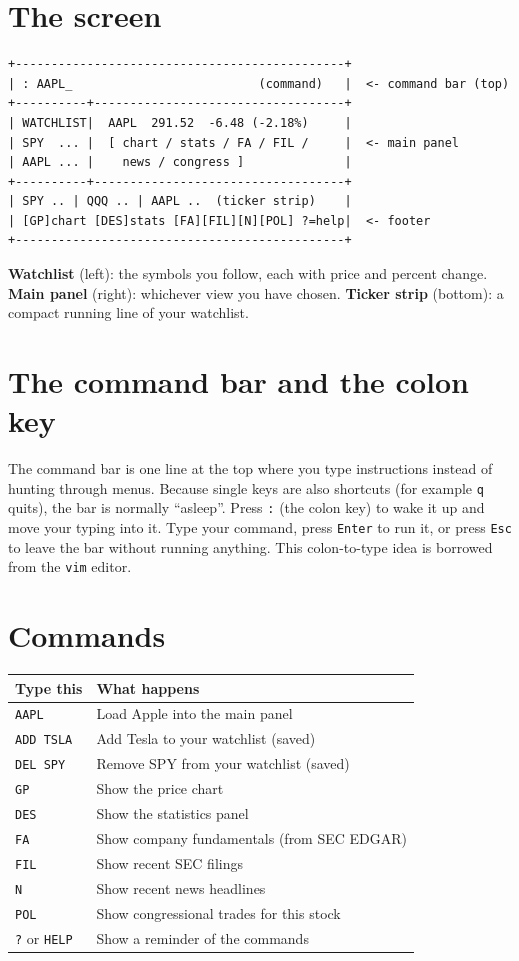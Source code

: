 \documentclass[11pt]{article}
\begin{document}
\section{The screen}
\begin{Verbatim}[frame=single]
+----------------------------------------------+
| : AAPL_                          (command)   |  <- command bar (top)
+----------+-----------------------------------+
| WATCHLIST|  AAPL  291.52  -6.48 (-2.18%)     |
| SPY  ... |  [ chart / stats / FA / FIL /     |  <- main panel
| AAPL ... |    news / congress ]              |
+----------+-----------------------------------+
| SPY .. | QQQ .. | AAPL ..  (ticker strip)    |
| [GP]chart [DES]stats [FA][FIL][N][POL] ?=help|  <- footer
+----------------------------------------------+
\end{Verbatim}
\textbf{Watchlist} (left): the symbols you follow, each with price and percent
change. \textbf{Main panel} (right): whichever view you have chosen. \textbf{Ticker
strip} (bottom): a compact running line of your watchlist.

\section{The command bar and the colon key}
The command bar is one line at the top where you type instructions instead of
hunting through menus. Because single keys are also shortcuts (for example
\texttt{q} quits), the bar is normally ``asleep''. Press \texttt{:} (the colon
key) to wake it up and move your typing into it. Type your command, press
\texttt{Enter} to run it, or press \texttt{Esc} to leave the bar without running
anything. This colon-to-type idea is borrowed from the \texttt{vim} editor.

\section{Commands}
\begin{center}
\begin{tabular}{ll}
\toprule
Type this & What happens \\
\midrule
\texttt{AAPL} & Load Apple into the main panel \\
\texttt{ADD TSLA} & Add Tesla to your watchlist (saved) \\
\texttt{DEL SPY} & Remove SPY from your watchlist (saved) \\
\texttt{GP} & Show the price chart \\
\texttt{DES} & Show the statistics panel \\
\texttt{FA} & Show company fundamentals (from SEC EDGAR) \\
\texttt{FIL} & Show recent SEC filings \\
\texttt{N} & Show recent news headlines \\
\texttt{POL} & Show congressional trades for this stock \\
\texttt{?} or \texttt{HELP} & Show a reminder of the commands \\
\bottomrule
\end{tabular}
\end{center}
\end{document}
